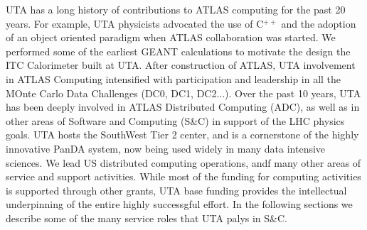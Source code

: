 
UTA has a long history of contributions to ATLAS computing for the past 20 years. For example, UTA physicists advocated the use of C$^{++}$ and the adoption of an object oriented paradigm when ATLAS collaboration was started. We performed some of the earliest GEANT calculations to motivate the design the ITC Calorimeter built at UTA. After construction of ATLAS, UTA involvement in ATLAS Computing intensified with participation and leadership in all the MOnte Carlo Data Challenges (DC0, DC1, DC2...). Over the past 10 years, UTA has been deeply involved in ATLAS Distributed Computing (ADC), as well as in other areas of Software and Computing (S\&C) in support of the LHC physics goals. UTA hosts the SouthWest Tier 2 center, and is a cornerstone of the highly innovative PanDA system, now being used widely in many data intensive sciences. We lead US distributed computing operations, andf many other areas of service and support activities. While most of the funding for computing activities is supported through other grants, UTA base funding provides the intellectual underpinning of the entire highly successgful effort. In the following sections we describe some of the many service roles that UTA palys in S\&C.

